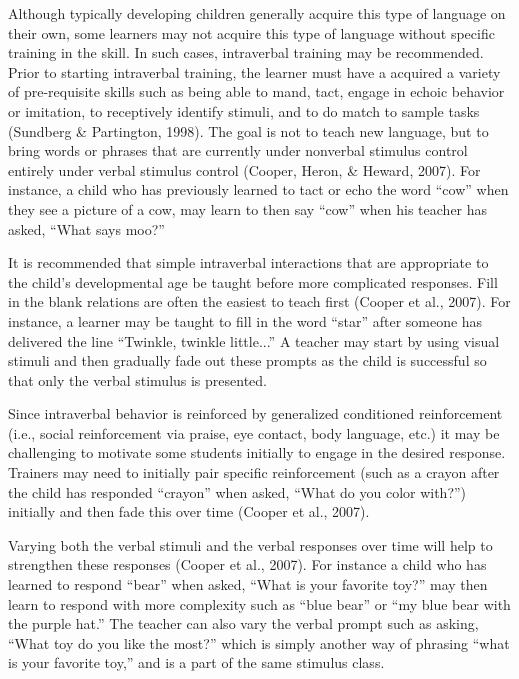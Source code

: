 Although typically developing children generally acquire this type of language on their own, some learners may not acquire this type of language without specific training in the skill.  In such cases, intraverbal training may be recommended.  Prior to starting intraverbal training, the learner must have a acquired a variety of pre-requisite skills such as being able to mand, tact, engage in echoic behavior or imitation, to receptively identify stimuli, and to do match to sample tasks (Sundberg \& Partington, 1998). The goal is not to teach new language, but to bring words or phrases that are currently under nonverbal stimulus control entirely under verbal stimulus control (Cooper, Heron, \& Heward, 2007).  For instance, a child who has previously learned to tact or echo the word ``cow'' when they see a picture of a cow, may learn to then say ``cow'' when his teacher has asked, ``What says moo?''

It is recommended that simple intraverbal interactions that are appropriate to the child's developmental age be taught before more complicated responses.  Fill in the blank relations are often the easiest to teach first (Cooper et al., 2007).  For instance, a learner may be taught to fill in the word ``star'' after someone has delivered the line ``Twinkle, twinkle little...''    A teacher may start by using visual stimuli and then gradually fade out these prompts as the child is successful so that only the verbal stimulus is presented.  

Since intraverbal behavior is reinforced by generalized conditioned reinforcement (i.e., social reinforcement via praise, eye contact, body language, etc.) it may be challenging to motivate some students initially to engage in the desired response.  Trainers may need to initially pair specific reinforcement (such as a crayon after the child has responded ``crayon'' when asked, ``What do you color with?'') initially and then fade this over time (Cooper et al., 2007). 

Varying both the verbal stimuli and the verbal responses over time will help to strengthen these responses (Cooper et al., 2007).   For instance a child who has learned to respond ``bear'' when asked, ``What is your favorite toy?'' may then learn to respond with more complexity such as ``blue bear'' or ``my blue bear with the purple hat.''  The teacher can also vary the verbal prompt such as asking, ``What toy do you like the most?'' which is simply another way of phrasing ``what is your favorite toy,'' and is a part of the same stimulus class.    


